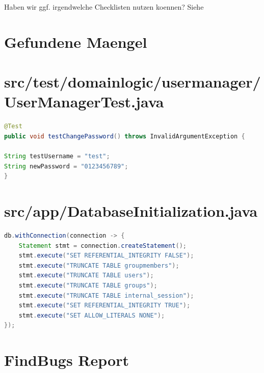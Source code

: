\documentclass[12pt,DIV14,BCOR10mm,a4paper,twoside,parskip=half-,headsepline,headinclude,english,ngerman,bibliography=totocnumbered]{scrreprt}
\begin{document}
Haben wir ggf. irgendwelche Checklisten nutzen koennen?
Siehe

\chapter{Gefundene Maengel}

\printbibliography

\printacronyms[title=Abkürzungsverzeichnis,toctitle=Abkürzungsverzeichnis]
\printglossary[type=main]

\listoffigures      %


\begin{appendices}

\chapter{src/test/domainlogic/usermanager/UserManagerTest.java}
\begin{lstlisting}[language=Java,caption=Hardkodiertes Passwort in einem Test aus der Klasse \texttt{UserManagerTest},label={lst:staticanalysis-hardcoded-pw}]
@Test
public void testChangePassword() throws InvalidArgumentException {

String testUsername = "test";
String newPassword = "0123456789";
}
\end{lstlisting}

\chapter{src/app/DatabaseInitialization.java}
\begin{lstlisting}[language=Java,caption=Von SecureAssist gefundenes False Positive Beispiel fuer Query Injections,label={lst:staticanalysis-query-injection}]
db.withConnection(connection -> {
	Statement stmt = connection.createStatement();
	stmt.execute("SET REFERENTIAL_INTEGRITY FALSE");
	stmt.execute("TRUNCATE TABLE groupmembers");
	stmt.execute("TRUNCATE TABLE users");
	stmt.execute("TRUNCATE TABLE groups");
	stmt.execute("TRUNCATE TABLE internal_session");
	stmt.execute("SET REFERENTIAL_INTEGRITY TRUE");
	stmt.execute("SET ALLOW_LITERALS NONE");
});
\end{lstlisting}

\chapter{FindBugs Report}
\label{staticanalysis-find-bugs}
%

\end{appendices}
\end{document}
